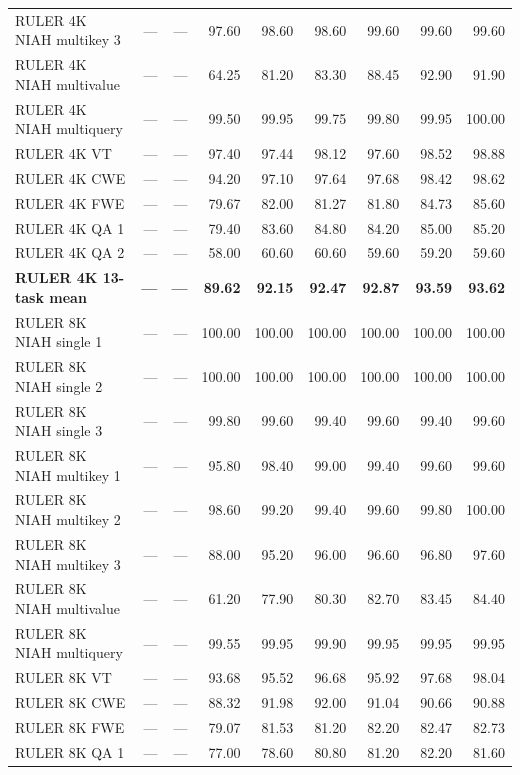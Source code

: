 \begin{longtable}{@{}lrrrrrrrr@{}}
RULER 4K NIAH multikey 3 & --- & --- & 97.60 & 98.60 & 98.60 & 99.60 & 99.60 & 99.60 \\
RULER 4K NIAH multivalue & --- & --- & 64.25 & 81.20 & 83.30 & 88.45 & 92.90 & 91.90 \\
RULER 4K NIAH multiquery & --- & --- & 99.50 & 99.95 & 99.75 & 99.80 & 99.95 & 100.00 \\
RULER 4K VT & --- & --- & 97.40 & 97.44 & 98.12 & 97.60 & 98.52 & 98.88 \\
RULER 4K CWE & --- & --- & 94.20 & 97.10 & 97.64 & 97.68 & 98.42 & 98.62 \\
RULER 4K FWE & --- & --- & 79.67 & 82.00 & 81.27 & 81.80 & 84.73 & 85.60 \\
RULER 4K QA 1 & --- & --- & 79.40 & 83.60 & 84.80 & 84.20 & 85.00 & 85.20 \\
RULER 4K QA 2 & --- & --- & 58.00 & 60.60 & 60.60 & 59.60 & 59.20 & 59.60 \\
\hline
\textbf{RULER 4K 13-task mean} & \textbf{---} & \textbf{---} & \textbf{89.62} & \textbf{92.15} & \textbf{92.47} & \textbf{92.87} & \textbf{93.59} & \textbf{93.62} \\
\hline
RULER 8K NIAH single 1 & --- & --- & 100.00 & 100.00 & 100.00 & 100.00 & 100.00 & 100.00 \\
RULER 8K NIAH single 2 & --- & --- & 100.00 & 100.00 & 100.00 & 100.00 & 100.00 & 100.00 \\
RULER 8K NIAH single 3 & --- & --- & 99.80 & 99.60 & 99.40 & 99.60 & 99.40 & 99.60 \\
RULER 8K NIAH multikey 1 & --- & --- & 95.80 & 98.40 & 99.00 & 99.40 & 99.60 & 99.60 \\
RULER 8K NIAH multikey 2 & --- & --- & 98.60 & 99.20 & 99.40 & 99.60 & 99.80 & 100.00 \\
RULER 8K NIAH multikey 3 & --- & --- & 88.00 & 95.20 & 96.00 & 96.60 & 96.80 & 97.60 \\
RULER 8K NIAH multivalue & --- & --- & 61.20 & 77.90 & 80.30 & 82.70 & 83.45 & 84.40 \\
RULER 8K NIAH multiquery & --- & --- & 99.55 & 99.95 & 99.90 & 99.95 & 99.95 & 99.95 \\
RULER 8K VT & --- & --- & 93.68 & 95.52 & 96.68 & 95.92 & 97.68 & 98.04 \\
RULER 8K CWE & --- & --- & 88.32 & 91.98 & 92.00 & 91.04 & 90.66 & 90.88 \\
RULER 8K FWE & --- & --- & 79.07 & 81.53 & 81.20 & 82.20 & 82.47 & 82.73 \\
RULER 8K QA 1 & --- & --- & 77.00 & 78.60 & 80.80 & 81.20 & 82.20 & 81.60 \\

\end{longtable}
